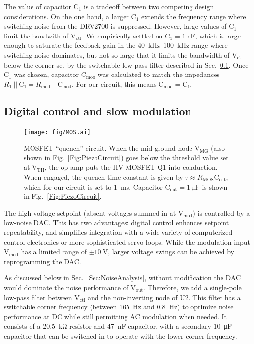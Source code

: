 \documentclass[aip,rsi,reprint]{revtex4-1} %
\begin{document}
The value of capacitor $\text{C}_1$ is a tradeoff between two competing design considerations.
On the one hand, a larger $\text{C}_1$ extends the frequency range where switching noise from the DRV2700 is suppressed.
However, large values of $\text{C}_1$ limit the bandwith of $\text{V}_\text{ctl}$.
We empirically settled on $\text{C}_1 = \SI{1}{\nano\farad}$, which is large enough to saturate the feedback gain in the \SI{40}{\kilo\hertz}--\SI{100}{\kilo\hertz} range where switching noise dominates, but not so large that it limits the bandwidth of $\text{V}_\text{ctl}$ below the corner set by the switchable low-pass filter described in Sec.~\ref{Sec:SlowModulationMOS}.
Once $\text{C}_1$ was chosen, capacitor $\text{C}_\text{mod}$ was calculated to match the impedances $R_1~||~\text{C}_1 = R_\text{mod}~||~\text{C}_\text{mod}$.
For our circuit, this means $\text{C}_\text{mod} = \text{C}_1$.


\subsection{Digital control and slow modulation}
\label{Sec:SlowModulationMOS}

\begin{figure}[t!]
\texttt{[image: fig/MOS.ai]}
\caption{MOSFET ``quench'' circuit.
When the mid-ground node $\text{V}_\text{MG}$ (also shown in Fig.~\ref{Fig:PiezoCircuit}) goes below the threshold value set at $\text{V}_\text{TH}$, the op-amp puts the HV MOSFET Q1 into conduction.
When engaged, the quench time constant is given by $\tau \approx R_\text{MOS} \text{C}_\text{out}$, which for our circuit is set to \SI{1}{\milli\second}. Capacitor $\text{C}_\text{out}=\SI{1}{\micro\farad}$ is shown in Fig.~\ref{Fig:PiezoCircuit}.
\label{Fig:MOS}}
\end{figure}

The high-voltage setpoint (absent voltages summed in at $\text{V}_\text{mod}$) is controlled by a low-noise DAC.
This has two advantages: digital control enhances setpoint repeatability, and simplifies integration with a wide variety of computerized control electronics or more sophisticated servo loops.
While the modulation input $\text{V}_\text{mod}$ has a limited range of $\pm\SI{10}{\volt}$, larger voltage swings can be achieved by reprogramming the DAC.

As discussed below in Sec.~\ref{Sec:NoiseAnalysis}, without modification the DAC would dominate the noise performance of $\text{V}_\text{out}$.
Therefore, we add a single-pole low-pass filter between $\text{V}_\text{ctl}$ and the non-inverting node of U2.
This filter has a switchable corner frequency (between \SI{165}{\hertz} and \SI{0.8}{\hertz}) to optimize noise performance at DC while still permitting AC modulation when needed.
It consists of a \SI{20.5}{\kilo\ohm} resistor and \SI{47}{\nano\farad} capacitor, with a secondary \SI{10}{\micro\farad} capacitor that can be switched in to operate with the lower corner frequency.
\end{document}

